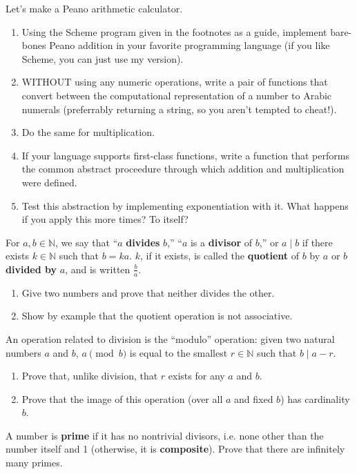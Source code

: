 \begin{prob}
  Let's make a Peano arithmetic calculator.
  \begin{enumerate}
  \item Using the Scheme program given in the footnotes as a guide, implement bare-bones Peano addition in your favorite programming language
    (if you like Scheme, you can just use my version).
  \item WITHOUT using any numeric operations, write a pair of functions that convert between the computational representation of a number
    to Arabic numerals (preferrably returning a string, so you aren't tempted to cheat!).
  \item Do the same for multiplication.
  \item If your language supports first-class functions, write a function that performs the common abstract proceedure through
    which addition and multiplication were defined.
  \item Test this abstraction by implementing exponentiation with it.
    What happens if you apply this more times?
    To itself?
  \end{enumerate}
\end{prob}

\begin{prob}[Divisibility]
  For $a, b \in \mathbb{N}$, we say that ``$a$ \textbf{divides} $b$,'' ``$a$ is a \textbf{divisor} of $b$,'' or $a \mid b$
  if there exists $k \in \mathbb{N}$ such that $b = ka$.
  $k$, if it exists, is called the \textbf{quotient} of $b$ by $a$ or $b$ \textbf{divided by} $a$, and is written $\frac{b}{a}$.
  \begin{enumerate}
  \item Give two numbers and prove that neither divides the other.
  \item Show by example that the quotient operation is not associative.

  \end{enumerate}
\end{prob}

\begin{prob}[Remainders]
  An operation related to division is the ``modulo'' operation: given two natural numbers $a$ and $b$,
  $a \pmod b$ is equal to the smallest $r \in \mathbb{N}$ such that $b \mid a - r$.
  \begin{enumerate}
  \item Prove that, unlike division, that $r$ exists for any $a$ and $b$.
  \item Prove that the image of this operation (over all $a$ and fixed $b$) has cardinality $b$.
  \end{enumerate}
\end{prob}

\begin{prob} %
  A number is \textbf{prime} if it has no nontrivial divisors, i.e. none other than the number itself and 1 (otherwise, it is \textbf{composite}).
  Prove that there are infinitely many primes.
\end{prob}



